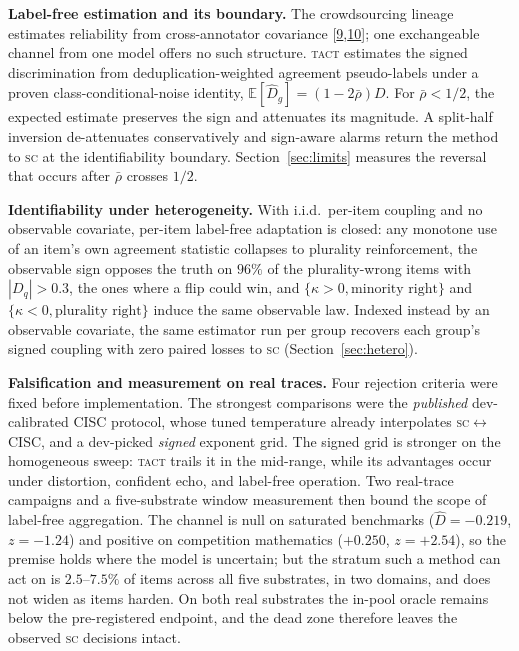 \documentclass[conference]{IEEEtran}
\newcommand{\Dhat}{\widehat{D}}
\newcommand{\SC}{\textsc{sc}}
\newcommand{\TACT}{\textsc{tact}}
\begin{document}
\textbf{Label-free estimation and its boundary.} The crowdsourcing lineage
estimates reliability from cross-annotator covariance
[\hyperlink{bib:dawid1979maximum}{9},\hyperlink{bib:parisi2014ranking}{10}]; one exchangeable channel from one
model offers no such structure. \TACT{} estimates the signed discrimination
from deduplication-weighted agreement pseudo-labels under a proven
class-conditional-noise identity, $\mathbb{E}[\Dhat_g]=(1-2\bar\rho)D$. For
$\bar\rho<1/2$, the expected estimate preserves the sign and attenuates its
magnitude. A split-half inversion
de-attenuates conservatively and sign-aware alarms return the method to \SC{}
at the identifiability boundary. Section~\ref{sec:limits} measures the reversal
that occurs after $\bar\rho$ crosses $1/2$.

\textbf{Identifiability under heterogeneity.} With i.i.d.\
per-item coupling and no observable covariate, per-item label-free adaptation
is closed: any monotone use of an item's own agreement statistic collapses to
plurality reinforcement, the observable sign opposes the truth on $96\%$ of
the plurality-wrong items with $|D_q|>0.3$, the ones where a flip could win, and
$\{\kappa>0,\text{minority right}\}$ and $\{\kappa<0,\text{plurality right}\}$
induce the same observable law. Indexed instead by an observable covariate,
the same estimator run per group recovers each group's signed coupling with
zero paired losses to \SC{} (Section~\ref{sec:hetero}).

\textbf{Falsification and measurement on real traces.} Four rejection criteria
were fixed before implementation. The strongest comparisons were the
\emph{published} dev-calibrated CISC protocol, whose tuned temperature already
interpolates \SC$\leftrightarrow$CISC, and a dev-picked \emph{signed} exponent
grid. The signed grid is stronger on the homogeneous sweep: \TACT{} trails it
in the mid-range, while its advantages occur under distortion, confident echo,
and label-free operation. Two real-trace campaigns and a five-substrate window
measurement then bound the scope of label-free aggregation. The channel is null on saturated
benchmarks ($\Dhat=-0.219$, $z=-1.24$) and positive on competition
mathematics ($+0.250$, $z=+2.54$), so the premise holds where the model is
uncertain; but the stratum such a method can act on is $2.5$--$7.5\%$ of items
across all five substrates, in two domains, and does not widen as items
harden.
On both real substrates the in-pool oracle remains below the pre-registered
endpoint, and the dead zone therefore leaves the observed \SC{} decisions intact.
\end{document}
